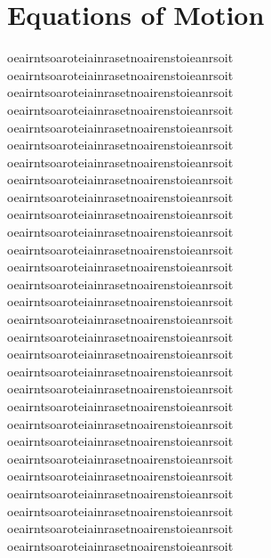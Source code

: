 \documentclass[%
 aip,
 amsmath,amssymb,
 reprint,%
 floatfix,%
]{revtex4-1}
\begin{document}
\section{\label{sec:level2}Equations of Motion}
oeairntsoaroteiainrasetnoairenstoieanrsoit\\
oeairntsoaroteiainrasetnoairenstoieanrsoit\\
oeairntsoaroteiainrasetnoairenstoieanrsoit\\
oeairntsoaroteiainrasetnoairenstoieanrsoit\\
oeairntsoaroteiainrasetnoairenstoieanrsoit\\
oeairntsoaroteiainrasetnoairenstoieanrsoit\\
oeairntsoaroteiainrasetnoairenstoieanrsoit\\
oeairntsoaroteiainrasetnoairenstoieanrsoit\\
oeairntsoaroteiainrasetnoairenstoieanrsoit\\
oeairntsoaroteiainrasetnoairenstoieanrsoit\\
oeairntsoaroteiainrasetnoairenstoieanrsoit\\
oeairntsoaroteiainrasetnoairenstoieanrsoit\\
oeairntsoaroteiainrasetnoairenstoieanrsoit\\
oeairntsoaroteiainrasetnoairenstoieanrsoit\\
oeairntsoaroteiainrasetnoairenstoieanrsoit\\
oeairntsoaroteiainrasetnoairenstoieanrsoit\\
oeairntsoaroteiainrasetnoairenstoieanrsoit\\
oeairntsoaroteiainrasetnoairenstoieanrsoit\\
oeairntsoaroteiainrasetnoairenstoieanrsoit\\
oeairntsoaroteiainrasetnoairenstoieanrsoit\\
oeairntsoaroteiainrasetnoairenstoieanrsoit\\
oeairntsoaroteiainrasetnoairenstoieanrsoit\\
oeairntsoaroteiainrasetnoairenstoieanrsoit\\
oeairntsoaroteiainrasetnoairenstoieanrsoit\\
oeairntsoaroteiainrasetnoairenstoieanrsoit\\
oeairntsoaroteiainrasetnoairenstoieanrsoit\\
oeairntsoaroteiainrasetnoairenstoieanrsoit\\
oeairntsoaroteiainrasetnoairenstoieanrsoit\\
oeairntsoaroteiainrasetnoairenstoieanrsoit\\
\end{document}
